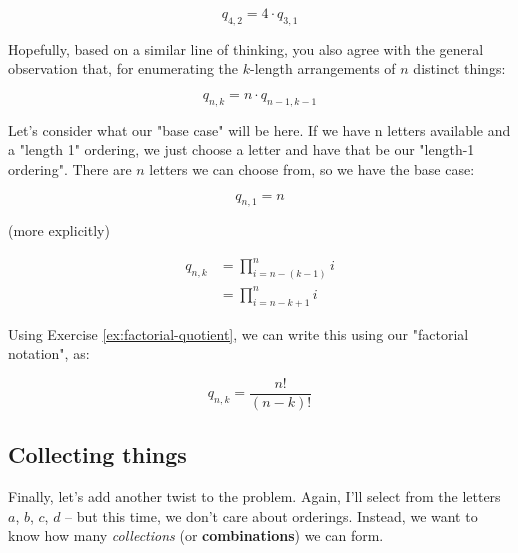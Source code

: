 \begin{equation*}
q_{4,2} = 4 \cdot q_{3,1}
\end{equation*}

Hopefully, based on a similar line of thinking, you also agree with the general observation that, for enumerating the $k$-length arrangements of $n$ distinct things:

\begin{equation*}
q_{n,k} = n \cdot q_{n-1,k-1}
\end{equation*}

Let's consider what our "base case" will be here. If we have n letters available and a "length 1" ordering, we just choose a letter and have that be our "length-1 ordering". There are $n$ letters we can choose from, so we have the base case: 

\begin{equation*}
q_{n,1} = n
\end{equation*}



(more explicitly)

\begin{align*}
q_{n,k} &= \prod_{i=n-(k-1)}^n i \\
&= \prod_{i=n-k+1}^n i
\end{align*}


Using Exercise \ref{ex:factorial-quotient}, we can write this using our "factorial notation", as:

\begin{equation}
\label{eq:perms-n-k}
q_{n,k} = \frac{n!}{(n-k)!}
\end{equation}



\subsection{Collecting things}

Finally, let's add another twist to the problem. Again, I'll select from the letters $a$, $b$, $c$, $d$ -- but this time, we don't care about orderings. Instead, we want to know how many \textit{collections} (or \textbf{combinations}) we can form. 

